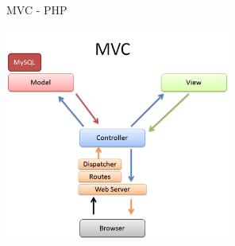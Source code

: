 \begin{frame}[fragile]{MVC - PHP}
  \begin{center}
    \includegraphics[height=7cm, keepaspectratio]{sources/images/mvc-in-php.png}
  \end{center}
\end{frame}
